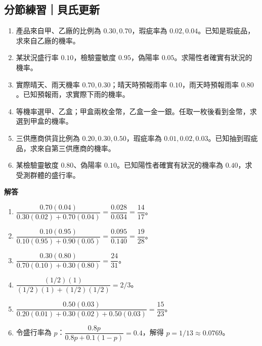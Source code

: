 \documentclass[11pt,a4paper]{article}
\providecommand{\tightlist}{%
  \setlength{\itemsep}{0pt}\setlength{\parskip}{0pt}}
\begin{document}
\begin{HandoutSelfCheck}

\subsection{分節練習｜貝氏更新}\label{ux5206ux7bc0ux7df4ux7fd2ux8c9dux6c0fux66f4ux65b0}

\begin{enumerate}
\def\labelenumi{\arabic{enumi}.}
\tightlist
\item
  產品來自甲、乙廠的比例為 \(0.30,0.70\)，瑕疵率為 \(0.02,0.04\)。已知是瑕疵品，求來自乙廠的機率。
\item
  某狀況盛行率 \(0.10\)，檢驗靈敏度 \(0.95\)，偽陽率 \(0.05\)。求陽性者確實有狀況的機率。
\item
  實際晴天、雨天機率 \(0.70,0.30\)；晴天時預報雨率 \(0.10\)，雨天時預報雨率 \(0.80\)。已知預報雨，求實際下雨的機率。
\item
  等機率選甲、乙盒；甲盒兩枚金幣，乙盒一金一銀。任取一枚後看到金幣，求選到甲盒的機率。
\item
  三供應商供貨比例為 \(0.20,0.30,0.50\)，瑕疵率為 \(0.01,0.02,0.03\)。已知抽到瑕疵品，求來自第三供應商的機率。
\item
  某檢驗靈敏度 \(0.80\)、偽陽率 \(0.10\)。已知陽性者確實有狀況的機率為 \(0.40\)，求受測群體的盛行率。
\end{enumerate}

\textbf{解答}

\begin{enumerate}
\def\labelenumi{\arabic{enumi}.}
\tightlist
\item
  \(\dfrac{0.70(0.04)}{0.30(0.02)+0.70(0.04)}=\dfrac{0.028}{0.034}=\boxed{\dfrac{14}{17}}\)。
\item
  \(\dfrac{0.10(0.95)}{0.10(0.95)+0.90(0.05)}=\dfrac{0.095}{0.140}=\boxed{\dfrac{19}{28}}\)。
\item
  \(\dfrac{0.30(0.80)}{0.70(0.10)+0.30(0.80)}=\boxed{\dfrac{24}{31}}\)。
\item
  \(\dfrac{(1/2)(1)}{(1/2)(1)+(1/2)(1/2)}=\boxed{2/3}\)。
\item
  \(\dfrac{0.50(0.03)}{0.20(0.01)+0.30(0.02)+0.50(0.03)}=\boxed{\dfrac{15}{23}}\)。
\item
  令盛行率為 \(p\)：\(\dfrac{0.8p}{0.8p+0.1(1-p)}=0.4\)，解得 \(\boxed{p=1/13\approx0.0769}\)。
\end{enumerate}

\end{HandoutSelfCheck}
\end{document}
